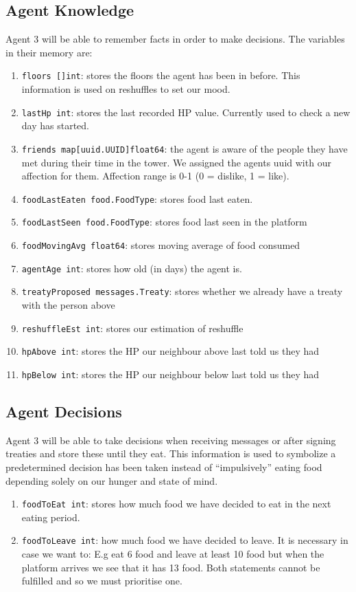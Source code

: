 \subsection{Agent Knowledge}
Agent 3 will be able to remember facts in order to make decisions. The variables in their memory are:
\begin{enumerate}
    \item \texttt{floors []int}: stores the floors the agent has been in before. This information is used on reshuffles to set our mood. 
    \item \texttt{lastHp int}: stores the last recorded HP value. Currently used to check a new day has started.
    \item \texttt{friends map[uuid.UUID]float64}: the agent is aware of the people they have met during their time in the tower. We assigned the agents uuid with our affection for them. Affection range is 0-1 (0 = dislike, 1 = like). 
    \item \texttt{foodLastEaten food.FoodType}: stores food last eaten.
    \item \texttt{foodLastSeen food.FoodType}: stores food last seen in the platform
    \item \texttt{foodMovingAvg float64}: stores moving average of food consumed
    \item \texttt{agentAge int}: stores how old (in days) the agent is.
    \item \texttt{treatyProposed messages.Treaty}: stores whether we already have a treaty with the person above
    \item \texttt{reshuffleEst int}: stores our estimation of reshuffle
    \item \texttt{hpAbove int}: stores the HP our neighbour above last told us they had
    \item \texttt{hpBelow int}: stores the HP our neighbour below last told us they had
  \end{enumerate}

\subsection{Agent Decisions}
Agent 3 will be able to take decisions when receiving messages or after signing treaties and store these until they eat. This information is used to symbolize a predetermined decision has been taken instead of “impulsively” eating food depending solely on our hunger and state of mind.
\begin{enumerate}
    \item \texttt{foodToEat int}: stores how much food we have decided to eat in the next eating period.
    \item \texttt{foodToLeave int}: how much food we have decided to leave. It is necessary in case we want to: E.g eat 6 food and leave at least 10 food but when the platform arrives we see that it has 13 food. Both statements cannot be fulfilled and so we must prioritise one.
\end{enumerate}

